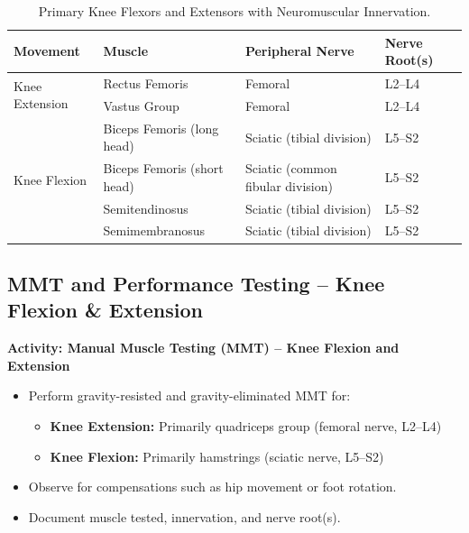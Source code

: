 \begin{table}[H]
\centering
\captionsetup{justification=raggedright, singlelinecheck=false}
\begin{tabular}{|p{4cm}|p{5cm}|p{4cm}|p{2.5cm}|}
\hline
\textbf{Movement} & \textbf{Muscle} & \textbf{Peripheral Nerve} & \textbf{Nerve Root(s)} \\
\hline
\multirow{2}{*}{Knee Extension}
  & Rectus Femoris & Femoral & L2--L4 \\
  & Vastus Group & Femoral & L2--L4 \\
\hline
\multirow{4}{*}{Knee Flexion}
  & Biceps Femoris (long head) & Sciatic (tibial division) & L5--S2 \\
  & Biceps Femoris (short head) & Sciatic (common fibular division) & L5--S2 \\
  & Semitendinosus & Sciatic (tibial division) & L5--S2 \\
  & Semimembranosus & Sciatic (tibial division) & L5--S2 \\
\hline
\end{tabular}
\caption{Primary Knee Flexors and Extensors with Neuromuscular Innervation.}
\end{table}

\subsection*{MMT and Performance Testing – Knee Flexion \& Extension}

\begin{labactivitybox}
\textbf{Activity: Manual Muscle Testing (MMT) – Knee Flexion and Extension}

\begin{itemize}
  \item Perform gravity-resisted and gravity-eliminated MMT for:
    \begin{itemize}
      \item \textbf{Knee Extension:} Primarily quadriceps group (femoral nerve, L2–L4)
      \item \textbf{Knee Flexion:} Primarily hamstrings (sciatic nerve, L5–S2)
    \end{itemize}
  \item Observe for compensations such as hip movement or foot rotation.
  \item Document muscle tested, innervation, and nerve root(s).
\end{itemize}
\end{labactivitybox}

